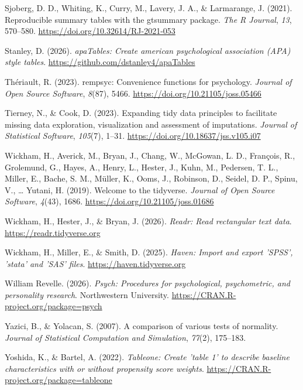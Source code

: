 \documentclass[
  letterpaper,
  DIV=11,
  numbers=noendperiod]{scrreprt}
\newlength{\cslhangindent}
\newenvironment{CSLReferences}[2] %
 {\begin{list}{}{%
  \setlength{\itemindent}{0pt}
  \setlength{\leftmargin}{0pt}
  \setlength{\parsep}{0pt}
  \ifodd #1
   \setlength{\leftmargin}{\cslhangindent}
   \setlength{\itemindent}{-1\cslhangindent}
  \fi
  \setlength{\itemsep}{#2\baselineskip}}}
 {\end{list}}
\begin{document}
\begin{CSLReferences}{1}{0}
Sjoberg, D. D., Whiting, K., Curry, M., Lavery, J. A., \& Larmarange, J.
(2021). Reproducible summary tables with the gtsummary package.
\emph{{The R Journal}}, \emph{13}, 570--580.
\url{https://doi.org/10.32614/RJ-2021-053}

Stanley, D. (2026). \emph{apaTables: Create american psychological
association (APA) style tables}.
\url{https://github.com/dstanley4/apaTables}

Thériault, R. (2023). {rempsyc}: Convenience functions for psychology.
\emph{Journal of Open Source Software}, \emph{8}(87), 5466.
\url{https://doi.org/10.21105/joss.05466}

Tierney, N., \& Cook, D. (2023). Expanding tidy data principles to
facilitate missing data exploration, visualization and assessment of
imputations. \emph{Journal of Statistical Software}, \emph{105}(7),
1--31. \url{https://doi.org/10.18637/jss.v105.i07}

Wickham, H., Averick, M., Bryan, J., Chang, W., McGowan, L. D.,
François, R., Grolemund, G., Hayes, A., Henry, L., Hester, J., Kuhn, M.,
Pedersen, T. L., Miller, E., Bache, S. M., Müller, K., Ooms, J.,
Robinson, D., Seidel, D. P., Spinu, V., \ldots{} Yutani, H. (2019).
Welcome to the {tidyverse}. \emph{Journal of Open Source Software},
\emph{4}(43), 1686. \url{https://doi.org/10.21105/joss.01686}

Wickham, H., Hester, J., \& Bryan, J. (2026). \emph{Readr: Read
rectangular text data}. \url{https://readr.tidyverse.org}

Wickham, H., Miller, E., \& Smith, D. (2025). \emph{Haven: Import and
export 'SPSS', 'stata' and 'SAS' files}.
\url{https://haven.tidyverse.org}

William Revelle. (2026). \emph{Psych: Procedures for psychological,
psychometric, and personality research}. Northwestern University.
\url{https://CRAN.R-project.org/package=psych}

Yazici, B., \& Yolacan, S. (2007). A comparison of various tests of
normality. \emph{Journal of Statistical Computation and Simulation},
\emph{77}(2), 175--183.

Yoshida, K., \& Bartel, A. (2022). \emph{Tableone: Create 'table 1' to
describe baseline characteristics with or without propensity score
weights}. \url{https://CRAN.R-project.org/package=tableone}

\end{CSLReferences}
\end{document}
